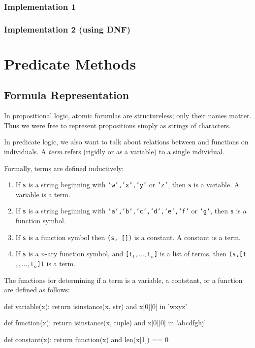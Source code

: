 \documentclass[a4paper,notitlepage]{scrartcl}
\begin{document}
\subsubsection{Implementation 1} 
\subsubsection{Implementation 2 (using DNF)}

\section{Predicate Methods}

\subsection{Formula Representation}
In propositional logic, atomic forumlas are structureless; only their
   names matter.
Thus we were free to represent propositions simply as strings of characters.

In predicate logic, we also want to talk about relations between and functions
   on individuals. 
A \emph{term} refers (rigidly or as a variable) to a single individual.

Formally, terms are defined inductively:
\begin{enumerate}
\item If \texttt{s} is a string beginning with \texttt{'w','x','y'} or 
   \texttt{'z'}, then \texttt{s} is a variable.
A variable is a term.
\item If \texttt{s} is a string beginning with \texttt{'a','b','c','d','e','f'} 
   or \texttt{'g'}, then \texttt{s} is a function symbol.
\item If \texttt{s} is a function symbol then \texttt{(s, [])} is a constant.
A constant is a term.
\item  
If \texttt{s} is a $n$-ary function symbol, and \texttt{[t$_1,\ldots,$t$_n$]} 
   is a list of terms, then \texttt{(s,[t$_1,\ldots,$t$_n$])} is a term.
\end{enumerate}

The functions for determining if a term is a variable, a contstant, or a
   function are defined as follows:
\begin{code}
def variable(x):
    return isinstance(x, str) and x[0][0] in 'wxyz'

def function(x):
    return isinstance(x, tuple) and x[0][0] in 'abcdfghj'

def constant(x):
    return function(x) and len(x[1]) == 0 
\end{code}
\end{document}
